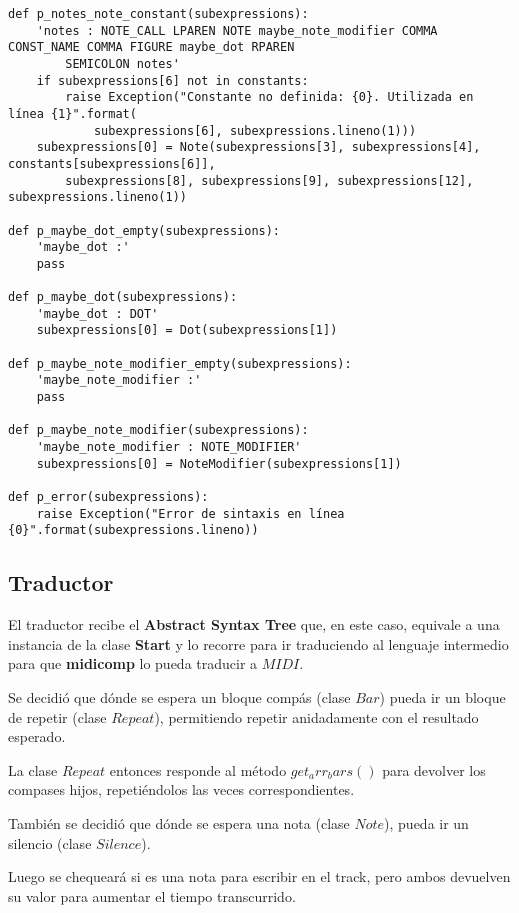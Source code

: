 \begin{verbatim}
def p_notes_note_constant(subexpressions):
    'notes : NOTE_CALL LPAREN NOTE maybe_note_modifier COMMA CONST_NAME COMMA FIGURE maybe_dot RPAREN
        SEMICOLON notes'
    if subexpressions[6] not in constants:
        raise Exception("Constante no definida: {0}. Utilizada en línea {1}".format(
            subexpressions[6], subexpressions.lineno(1)))
    subexpressions[0] = Note(subexpressions[3], subexpressions[4], constants[subexpressions[6]],
        subexpressions[8], subexpressions[9], subexpressions[12], subexpressions.lineno(1))

def p_maybe_dot_empty(subexpressions):
    'maybe_dot :'
    pass

def p_maybe_dot(subexpressions):
    'maybe_dot : DOT'
    subexpressions[0] = Dot(subexpressions[1])

def p_maybe_note_modifier_empty(subexpressions):
    'maybe_note_modifier :'
    pass

def p_maybe_note_modifier(subexpressions):
    'maybe_note_modifier : NOTE_MODIFIER'
    subexpressions[0] = NoteModifier(subexpressions[1])

def p_error(subexpressions):
    raise Exception("Error de sintaxis en línea {0}".format(subexpressions.lineno))

\end{verbatim}

\newpage

\subsection{Traductor}

El traductor recibe el \textbf{Abstract Syntax Tree} que, en este caso, equivale a una instancia de la clase \textbf{Start} y lo recorre para ir traduciendo al lenguaje intermedio para que \textbf{midicomp} lo pueda traducir a $MIDI$.

Se decidió que dónde se espera un bloque compás (clase $Bar$) pueda ir un bloque de repetir (clase $Repeat$), permitiendo repetir anidadamente con el resultado esperado.

La clase $Repeat$ entonces responde al método $get_arr_bars()$ para devolver los compases hijos, repetiéndolos las veces correspondientes.

También se decidió que dónde se espera una nota (clase $Note$), pueda ir un silencio (clase $Silence$).

Luego se chequeará si es una nota para escribir en el track, pero ambos devuelven su valor para aumentar el tiempo transcurrido.

